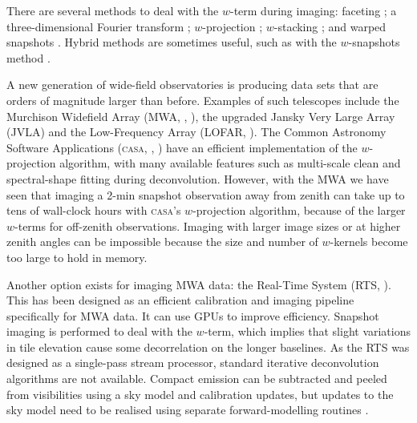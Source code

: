\documentclass[useAMS,usenatbib]{mn2e}
\begin{document}
There are several methods to deal with the $w$-term during imaging: faceting \citep{facetting-cornwell}; a three-dimensional Fourier transform \citep{perley-noncoplanar-arrays}; $w$-projection \citep*{wprojection-cornwell}; $w$-stacking \citep{ska-memo-regridding-2011}; and warped snapshots \citep{perley-noncoplanar-arrays}. Hybrid methods are sometimes useful, such as with the $w$-snapshots method \citep*{widefield-imaging-ska-cornwell}.

A new generation of wide-field observatories is producing data sets that are orders of magnitude larger than before. Examples of such telescopes include the Murchison Widefield Array (MWA, \citealt{mwa-design-2009}, \citealt{mwa}), the upgraded Jansky Very Large Array (JVLA) and the Low-Frequency Array (LOFAR, \citealt{lofar-2013}). The Common Astronomy Software Applications (\textsc{casa}, \citealt{casa-2007}, \citealt{casa-2008}) have an efficient implementation of the $w$-projection algorithm, with many available features such as multi-scale clean and spectral-shape fitting during deconvolution. However, with the MWA we have seen that imaging a 2-min snapshot observation away from zenith can take up to tens of wall-clock hours with \textsc{casa}'s $w$-projection algorithm, because of the larger $w$-terms for off-zenith observations. Imaging with larger image sizes or at higher zenith angles can be impossible because the size and number of $w$-kernels become too large to hold in memory.

Another option exists for imaging MWA data: the Real-Time System (RTS, \citealt{rts-mwa,mwa-interferometric-imaging}). This has been designed as an efficient calibration and imaging pipeline specifically for MWA data. It can use GPUs to improve efficiency. Snapshot imaging is performed to deal with the $w$-term, which implies that slight variations in tile elevation cause some decorrelation on the longer baselines. As the RTS was designed as a single-pass stream processor, standard iterative deconvolution algorithms are not available. Compact emission can be subtracted and peeled from visibilities using a sky model and calibration updates, but updates to the sky model need to be realised using separate forward-modelling routines \citep{forward-modelling-bernardi-2011, pindor-subtracting-sources-2011}.
\end{document}
